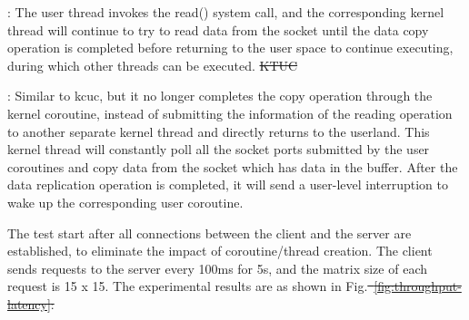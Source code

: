 \documentclass[sigconf,review,anonymous]{acmart}
\providecommand{\DIFadd}[1]{{\protect\color{blue}\uwave{#1}}} %
\providecommand{\DIFdel}[1]{{\protect\color{red}\sout{#1}}}                      %
\providecommand{\DIFaddbegin}{} %
\providecommand{\DIFaddend}{} %
\providecommand{\DIFdelbegin}{} %
\providecommand{\DIFdelend}{} %
\begin{document}
\textbf{\DIFadd{KTUT}}\DIFaddend : The user thread invokes the read() system call, and the corresponding kernel thread will continue to try to read data from the socket until the data copy operation is completed before returning to the user space to continue executing, during which other threads can be executed.
	\DIFdelbegin %
\DIFdel{KTUC}\DIFdelend \DIFaddbegin 

\textbf{\DIFadd{KTUC}}\DIFaddend : Similar to kcuc, but it no longer completes the copy operation through the kernel coroutine, instead of submitting the information of the reading operation to another separate kernel thread and directly returns to the userland. This kernel thread will constantly poll all the socket ports submitted by the user coroutines and copy data from the socket which has data in the buffer. After the data replication operation is completed, it will send a user-level interruption to wake up the corresponding user coroutine.
\DIFdelbegin %
\DIFdelend 


The test start after all connections between the client and the server are established, to eliminate the impact of coroutine/thread creation. The client sends requests to the server every 100ms for 5s, and the matrix size of each request is 15 x 15. The experimental results are as shown in Fig.\DIFdelbegin \DIFdel{~\ref{fig:throughput-latency}:
}\DIFdelend \DIFaddbegin \DIFadd{\ref{fig:throughput-latency}.
}\DIFaddend 
\end{document}
